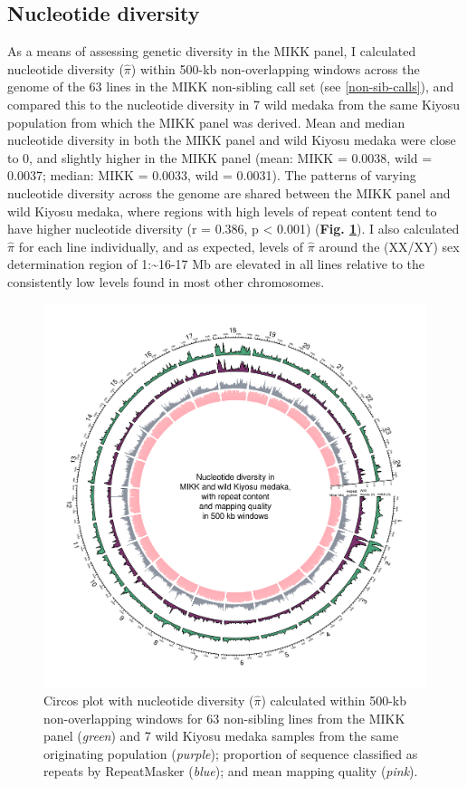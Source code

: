 \documentclass[
]{book}
\begin{document}
\hypertarget{nuc-div}{%
\subsection{Nucleotide diversity}\label{nuc-div}}

As a means of assessing genetic diversity in the MIKK panel, I calculated nucleotide diversity (\(\hat{\pi}\)) within 500-kb non-overlapping windows across the genome of the 63 lines in the MIKK non-sibling call set (see \ref{non-sib-calls}), and compared this to the nucleotide diversity in 7 wild medaka from the same Kiyosu population from which the MIKK panel was derived. Mean and median nucleotide diversity in both the MIKK panel and wild Kiyosu medaka were close to 0, and slightly higher in the MIKK panel (mean: MIKK = 0.0038, wild = 0.0037; median: MIKK = 0.0033, wild = 0.0031). The patterns of varying nucleotide diversity across the genome are shared between the MIKK panel and wild Kiyosu medaka, where regions with high levels of repeat content tend to have higher nucleotide diversity (r = 0.386, p \textless{} 0.001) (\textbf{Fig. \ref{fig:NucleotideDiversity}}). I also calculated \(\hat{\pi}\) for each line individually, and as expected, levels of \(\hat{\pi}\) around the (XX/XY) sex determination region of 1:\textasciitilde16-17 Mb are elevated in all lines relative to the consistently low levels found in most other chromosomes.



\begin{figure}
\includegraphics[width=1\linewidth]{figs/mikk_genome/supp_01_pi_circos} \caption{Circos plot with nucleotide diversity (\(\hat{\pi}\)) calculated within 500-kb non-overlapping windows for 63 non-sibling lines from the MIKK panel (\emph{green}) and 7 wild Kiyosu medaka samples from the same originating population (\emph{purple}); proportion of sequence classified as repeats by RepeatMasker (\emph{blue}); and mean mapping quality (\emph{pink}).}\label{fig:NucleotideDiversity}
\end{figure}
\end{document}
